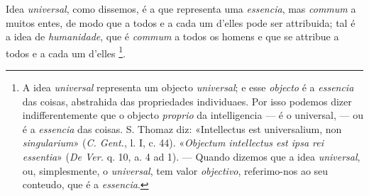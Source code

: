 Idea \emph{universal}, como dissemos, é a que representa uma \emph{essencia}, mas \emph{commum} a muitos entes, de modo que a todos e a cada um d'elles pode ser attribuida; tal é a idea de \emph{humanidade}, que é \emph{commum} a todos os homens e que se attribue a todos e a cada um d'elles \footnote{A idea \emph{universal} representa um objecto \emph{universal}; e esse \emph{objecto} é a \emph{essencia} das coisas, abstrahida das propriedades individuaes. Por isso podemos dizer indifferentemente que o objecto \emph{proprio} da intelligencia --- é o universal, --- ou é a \emph{essencia} das coisas. S. Thomaz diz: «Intellectus est universalium, non \emph{singularium}» (\emph{C. Gent.}, l. I, c. 44). «\emph{Objectum intellectus est ipsa rei essentia}» (\emph{De Ver.} q. 10, a. 4 ad 1). --- Quando dizemos que a idea \emph{universal}, ou, simplesmente, o \emph{universal}, tem valor \emph{objectivo}, referimo-nos ao seu conteudo, que é a \emph{essencia}.}.



